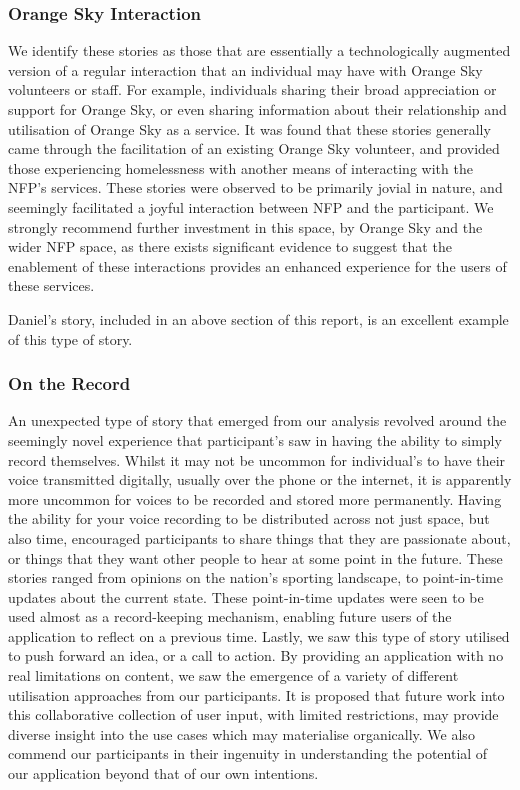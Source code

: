 \subsubsection{Orange Sky Interaction}

We identify these stories as those that are essentially a technologically augmented version of a regular interaction that an individual may have with Orange Sky volunteers or staff. For example, individuals sharing their broad appreciation or support for Orange Sky, or even sharing information about their relationship and utilisation of Orange Sky as a service. It was found that these stories generally came through the facilitation of an existing Orange Sky volunteer, and provided those experiencing homelessness with another means of interacting with the NFP's services. These stories were observed to be primarily jovial in nature, and seemingly facilitated a joyful interaction between NFP and the participant. We strongly recommend further investment in this space, by Orange Sky and the wider NFP space, as there exists significant evidence to suggest that the enablement of these interactions provides an enhanced experience for the users of these services.

Daniel's story, included in an above section of this report, is an excellent example of this type of story.

\subsubsection{On the Record}

An unexpected type of story that emerged from our analysis revolved around the seemingly novel experience that participant's saw in having the ability to simply record themselves. Whilst it may not be uncommon for individual's to have their voice transmitted digitally, usually over the phone or the internet, it is apparently more uncommon for voices to be recorded and stored more permanently. Having the ability for your voice recording to be distributed across not just space, but also time, encouraged participants to share things that they are passionate about, or things that they want other people to hear at some point in the future. These stories ranged from opinions on the nation's sporting landscape, to point-in-time updates about the current state. These point-in-time updates were seen to be used almost as a record-keeping mechanism, enabling future users of the application to reflect on a previous time. Lastly, we saw this type of story utilised to push forward an idea, or a call to action. By providing an application with no real limitations on content, we saw the emergence of a variety of different utilisation approaches from our participants. It is proposed that future work into this collaborative collection of user input, with limited restrictions, may provide diverse insight into the use cases which may materialise organically. We also commend our participants in their ingenuity in understanding the potential of our application beyond that of our own intentions.

